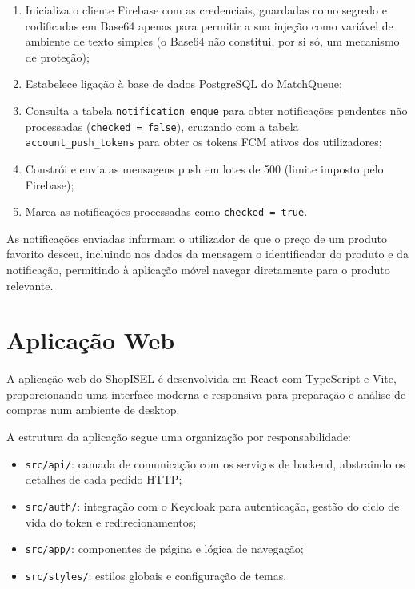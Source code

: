 \begin{enumerate}
    \item Inicializa o cliente Firebase com as credenciais, guardadas como segredo e codificadas em Base64 apenas para permitir a sua injeção como variável de ambiente de texto simples (o Base64 não constitui, por si só, um mecanismo de proteção);
    \item Estabelece ligação à base de dados PostgreSQL do MatchQueue;
    \item Consulta a tabela \texttt{notification\_enque} para obter notificações pendentes não processadas (\texttt{checked = false}), cruzando com a tabela \texttt{account\_push\_tokens} para obter os tokens FCM ativos dos utilizadores;
    \item Constrói e envia as mensagens push em lotes de 500 (limite imposto pelo Firebase);
    \item Marca as notificações processadas como \texttt{checked = true}.
\end{enumerate}

As notificações enviadas informam o utilizador de que o preço de um produto favorito desceu, incluindo nos dados da mensagem o identificador do produto e da notificação, permitindo à aplicação móvel navegar diretamente para o produto relevante.

\section{Aplicação Web}
\label{sec:4.5}

A aplicação web do ShopISEL é desenvolvida em React com TypeScript e Vite, proporcionando uma interface moderna e responsiva para preparação e análise de compras num ambiente de desktop.

A estrutura da aplicação segue uma organização por responsabilidade:
\begin{itemize}
    \item \texttt{src/api/}: camada de comunicação com os serviços de backend, abstraindo os detalhes de cada pedido HTTP;
    \item \texttt{src/auth/}: integração com o Keycloak para autenticação, gestão do ciclo de vida do token e redirecionamentos;
    \item \texttt{src/app/}: componentes de página e lógica de navegação;
    \item \texttt{src/styles/}: estilos globais e configuração de temas.
\end{itemize}

